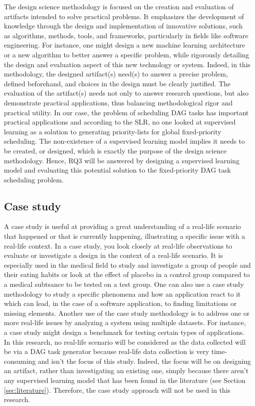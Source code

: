 The design science methodology is focused on the creation and evaluation 
of artifacts intended to solve practical problems. It emphasizes 
the development of knowledge through the design and implementation 
of innovative solutions, such as algorithms, methods, tools, 
and frameworks, particularly in fields like software engineering\cite{Wieringa2010DesignScienceMethod}.
For instance, one might design a new machine learning architecture or a new algorithm to 
better answer a specific problem, while rigorously detailing the design and evaluation aspect of this new technology or system.
Indeed, in this methodology,
the designed artifact(s) need(s) to answer a precise problem,
defined beforehand, and choices in the design must be clearly justified.
The evaluation of the artifact(s) needs not only to answer research questions, but also
demonstrate practical applications,
thus balancing methodological rigor and practical utility.
In our case, the problem of scheduling DAG tasks
has important practical applications and according to the SLR, 
no one looked at supervised learning as a solution to generating priority-lists for 
global fixed-priority scheduling.
The non-existence of a supervised learning model implies it needs to be created, or designed,
which is exactly the purpose of the design science methodology.
Hence, RQ3 will be answered by designing a supervised learning model and evaluating this potential solution to the fixed-priority DAG task scheduling problem.

\subsection{Case study}

A case study is useful at providing a great understanding of a real-life scenario that happened 
or that is currently happening, illustrating a specific issue with a real-life context.
In a case study, you look closely at real-life observations to evaluate or investigate
a design in the context of a real-life scenario\cite{sarah2011caseStudy}.
It is especially used in the medical field to study and investigate a group of people and their 
eating habits or look at the effect of placebo in a control group compared to a medical subtsance to be tested
on a test group.
One can also use a case study methodology to study a specific phenomena and how an application react to it
which can lead, in the case of a software application, to finding
limitations or missing elements.
Another use of the case study methodology is 
to address one or more real-life issues by analyzing 
a system using multiple datasets.
For instance, a case study might design a benchmark for testing 
certain types of applications.
In this research, no real-life scenario will be considered as 
the data collected will be via a DAG task generator because real-life data collection is very time-consuming
and isn't the focus of this study.
Indeed, the focus will be on designing an artifact,
rather than investigating an existing one, simply because there aren't any supervised 
learning model that has been found in the literature (see Section \ref{sec:literature}). 
Therefore, the case study approach will not be used in this research.

